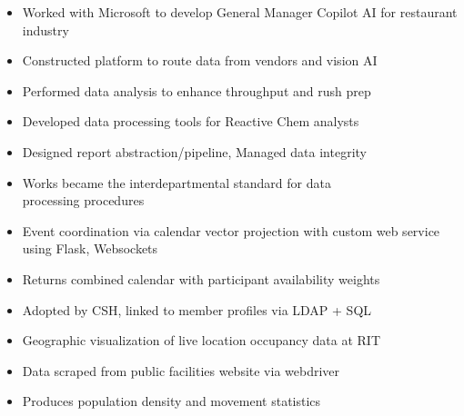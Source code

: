 \documentclass[10pt,a4paper,ragged2e,withhyper]{altacv}
\begin{document}
\begin{paracol}{2}


\begin{itemize}
    \item Worked with Microsoft to develop General Manager Copilot AI for restaurant industry
    \item Constructed platform to route data from vendors and vision AI
    \item Performed data analysis to enhance throughput and rush prep
\end{itemize}

\divider

\begin{itemize}
    \item Developed data processing tools for Reactive Chem analysts
    \item Designed report abstraction/pipeline, Managed data integrity
    \item Works became the interdepartmental standard for data\\processing procedures
\end{itemize}


\begin{itemize}
    \item Event coordination via calendar vector projection with custom web service using Flask, Websockets
    \item Returns combined calendar with participant availability weights
    \item Adopted by CSH, linked to member profiles via LDAP + SQL
\end{itemize}

\divider

\begin{itemize}
    \item Geographic visualization of live location occupancy data at RIT
    \item Data scraped from public facilities website via webdriver
    \item Produces population density and movement statistics
\end{itemize}


\end{paracol}
\end{document}
